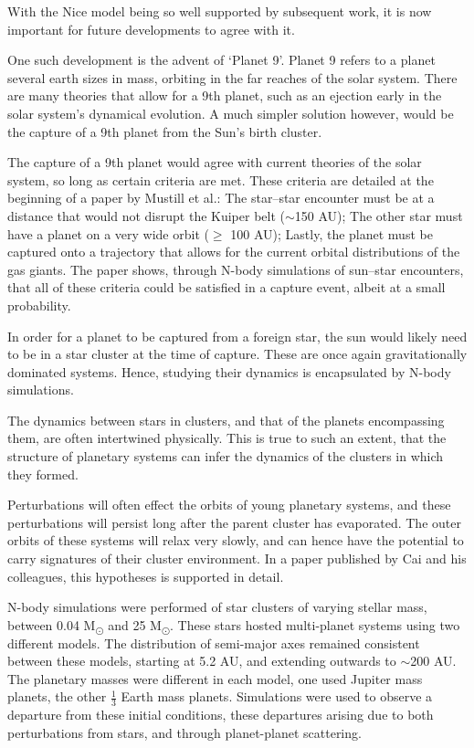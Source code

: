 \documentclass[a4paper,10pt]{article}
\begin{document}
With the Nice model being so well supported by subsequent work, it is now important for future developments to agree with it. 

One such development is the advent of `Planet 9'. Planet 9 refers to a planet several earth sizes in mass, orbiting in the far reaches of the solar system. There are many theories that allow for a 9th planet, such as an ejection early in the solar system's dynamical evolution. A much simpler solution however, would be the capture of a 9th planet from the Sun's birth cluster.  

The capture of a 9th planet would agree with current theories of the solar system, so long as certain criteria are met. These criteria are detailed at the beginning of a paper by Mustill et al.\cite{Planet 9}: The star--star encounter must be at a distance that would not disrupt the Kuiper belt ($\sim$150 AU); The other star must have a planet on a very wide orbit ($\geq$ 100 AU); Lastly, the planet must be captured onto a trajectory that allows for the current orbital distributions of the gas giants. The paper shows, through N-body simulations of sun--star encounters, that all of these criteria could be satisfied in a capture event, albeit at a small probability. 

In order for a planet to be captured from a foreign star, the sun would likely need to be in a star cluster at the time of capture. These are once again gravitationally dominated systems. Hence, studying their dynamics is encapsulated by N-body simulations.

The dynamics between stars in clusters, and that of the planets encompassing them, are often intertwined physically. This is true to such an extent, that the structure of planetary systems can infer the dynamics of the clusters in which they formed. 

Perturbations will often effect the orbits of young planetary systems, and these perturbations will persist long after the parent cluster has evaporated. The outer orbits of these systems will relax very slowly, and can hence have the potential to carry signatures of their cluster environment. In a paper published by Cai and his colleagues, this hypotheses is supported in detail\cite{Signatures}.

N-body simulations were performed of star clusters of varying stellar mass, between 0.04 M\textsubscript{\(\odot\)} and 25 M\textsubscript{\(\odot\)}. These stars hosted multi-planet systems using two different models. The distribution of semi-major axes remained consistent between these models, starting at 5.2 AU, and extending outwards to $\sim$200 AU. The planetary masses were different in each model, one used Jupiter mass planets, the other $\frac{1}{3}$ Earth mass planets. Simulations were used to observe a departure from these initial conditions, these departures arising due to both perturbations from stars, and through planet-planet scattering.
\end{document}
